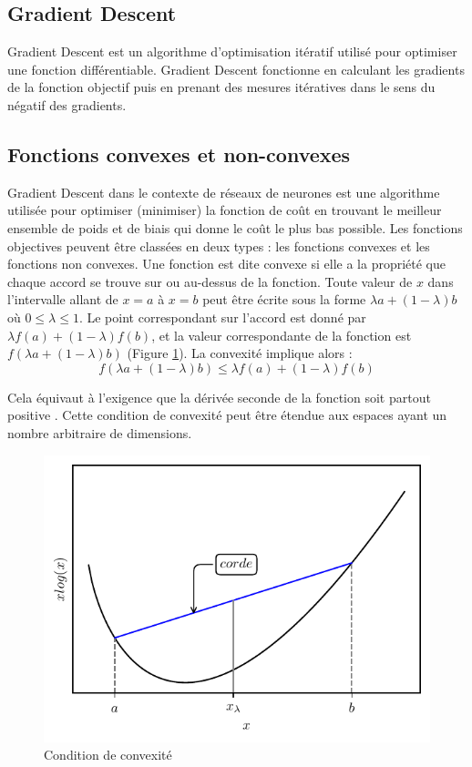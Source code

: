 \subsection{Gradient Descent}
Gradient Descent est un algorithme d'optimisation itératif utilisé pour optimiser une fonction différentiable. Gradient Descent fonctionne en calculant les gradients de la fonction objectif puis en prenant des mesures itératives dans le sens du négatif des gradients.

\subsection{Fonctions convexes et non-convexes}
Gradient Descent dans le contexte de réseaux de neurones est une algorithme utilisée pour optimiser (minimiser) la fonction de coût en trouvant le meilleur ensemble de poids et de biais qui donne le coût le plus bas possible. Les fonctions objectives peuvent être classées en deux types : les fonctions convexes et les fonctions non convexes.
Une fonction est dite convexe si elle a la propriété que chaque accord se trouve sur ou au-dessus de la fonction. Toute valeur de $x$ dans l'intervalle allant de $x=a$ à $x=b$ peut être écrite sous la forme $\lambda a+(1-\lambda)b$ où $0\leq\lambda\leq 1$. Le point correspondant sur l'accord est donné par $\lambda f(a)+(1-\lambda)f(b)$, et la valeur correspondante de la fonction est $f(\lambda a+(1-\lambda)b)$ (Figure \ref{fig:convexity}). La convexité implique alors :
\begin{equation}
    f(\lambda a+(1-\lambda)b)\leq \lambda f(a)+(1-\lambda)f(b)
    \label{equation:convexity}
\end{equation}

Cela équivaut à l'exigence que la dérivée seconde de la fonction soit partout positive \cite{Bishop2006}. Cette condition de convexité peut être étendue aux espaces ayant un nombre arbitraire de dimensions.

\begin{figure}[h]
    \centering
    \includegraphics{figures/convex_function_fr.pdf}
    \caption{Condition de convexité}
    \label{fig:convexity}
\end{figure}

